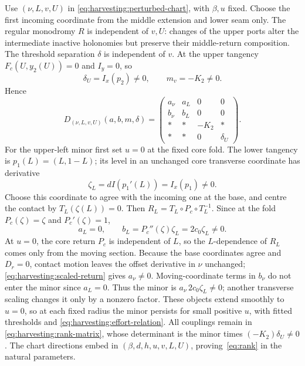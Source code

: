 Use \((\nu,L,v,U)\) in \eqref{eq:harvesting:perturbed-chart}, with
\(\beta,u\) fixed. Choose the first incoming coordinate from the
middle extension and lower seam only. The regular monodromy \(R\)
is independent of \(v,U\): changes of the upper ports alter the
intermediate inactive holonomies but preserve their middle-return
composition. The threshold separation \(\delta\) is independent of
\(v\). At the upper tangency \(F_c(U,y_2(U))=0\) and \(I_y=0\),
so
\begin{equation}\label{eq:harvesting:upper-rank}
 \delta_U=I_x(p_2)\ne0,\qquad m_v=-K_2\ne0.
\end{equation}
Hence
\begin{equation}\label{eq:harvesting:rank-matrix}
 D_{(\nu,L,v,U)}(a,b,m,\delta)=
 \begin{pmatrix}
 a_\nu&a_L&0&0\\ b_\nu&b_L&0&0\\
 *&*&-K_2&*\\ *&*&0&\delta_U
 \end{pmatrix}.
\end{equation}
For the upper-left minor first set \(u=0\) at the fixed core fold.
The lower tangency is \(p_1(L)=(L,1-L)\); its level in an unchanged
core transverse coordinate has derivative
\begin{equation}\label{eq:harvesting:lower-level}
 \zeta_L=dI(p_1'(L))=I_x(p_1)\ne0.
\end{equation}
Choose this coordinate to agree with the incoming one at the base,
and centre the contact by \(T_L(\zeta(L))=0\). Then
\(R_L=T_L\circ P_c\circ T_L^{-1}\). Since at the fold
\(P_c(\zeta)=\zeta\) and \(P_c'(\zeta)=1\),
\begin{equation}\label{eq:harvesting:lower-rank}
 a_L=0,\qquad b_L=P_c''(\zeta)\zeta_L
                   =2c_0\zeta_L\ne0.
\end{equation}
At \(u=0\), the core return \(P_c\) is independent of \(L\), so the
\(L\)-dependence of \(R_L\) comes only from the moving section. Because
the base coordinates agree and \(D_r=0\), contact motion leaves the
offset derivative in \(\nu\) unchanged;
\eqref{eq:harvesting:scaled-return} gives \(a_\nu\ne0\). Moving-coordinate
terms in \(b_\nu\) do not enter the minor since \(a_L=0\). Thus the minor
is \(a_\nu\,2c_0\zeta_L\ne0\); another transverse scaling changes it
only by a nonzero factor. These objects extend smoothly to
\(u=0\), so at each fixed radius the minor persists for small
positive \(u\), with fitted thresholds and
\eqref{eq:harvesting:effort-relation}. All couplings remain in
\eqref{eq:harvesting:rank-matrix}, whose determinant is the minor
times \((-K_2)\delta_U\ne0\). The chart directions embed in
\((\beta,d,h,u,v,L,U)\), proving~\eqref{eq:rank} in the natural
parameters.

